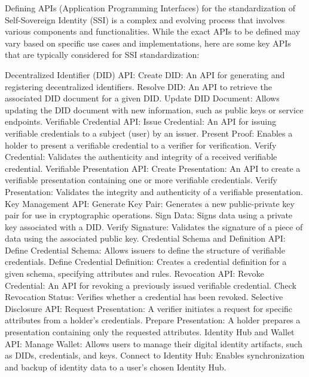 
Defining APIs (Application Programming Interfaces) for the standardization of Self-Sovereign Identity (SSI) is a complex and evolving process that involves various components and functionalities. While the exact APIs to be defined may vary based on specific use cases and implementations, here are some key APIs that are typically considered for SSI standardization:

Decentralized Identifier (DID) API:
Create DID: An API for generating and registering decentralized identifiers.
Resolve DID: An API to retrieve the associated DID document for a given DID.
Update DID Document: Allows updating the DID document with new information, such as public keys or service endpoints.
Verifiable Credential API:
Issue Credential: An API for issuing verifiable credentials to a subject (user) by an issuer.
Present Proof: Enables a holder to present a verifiable credential to a verifier for verification.
Verify Credential: Validates the authenticity and integrity of a received verifiable credential.
Verifiable Presentation API:
Create Presentation: An API to create a verifiable presentation containing one or more verifiable credentials.
Verify Presentation: Validates the integrity and authenticity of a verifiable presentation.
Key Management API:
Generate Key Pair: Generates a new public-private key pair for use in cryptographic operations.
Sign Data: Signs data using a private key associated with a DID.
Verify Signature: Validates the signature of a piece of data using the associated public key.
Credential Schema and Definition API:
Define Credential Schema: Allows issuers to define the structure of verifiable credentials.
Define Credential Definition: Creates a credential definition for a given schema, specifying attributes and rules.
Revocation API:
Revoke Credential: An API for revoking a previously issued verifiable credential.
Check Revocation Status: Verifies whether a credential has been revoked.
Selective Disclosure API:
Request Presentation: A verifier initiates a request for specific attributes from a holder's credentials.
Prepare Presentation: A holder prepares a presentation containing only the requested attributes.
Identity Hub and Wallet API:
Manage Wallet: Allows users to manage their digital identity artifacts, such as DIDs, credentials, and keys.
Connect to Identity Hub: Enables synchronization and backup of identity data to a user's chosen Identity Hub.
